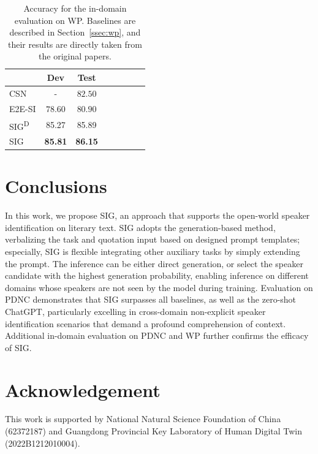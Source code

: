 \documentclass[letterpaper]{article} %
\begin{document}
\begin{table}[htbp!]
    \centering
    \begin{tabular}{l|c c c c c c c}
    \toprule
       & Dev & Test \\ 
       \midrule
        CSN & - & $82.50$ \\
        E2E-SI & $78.60$ & $80.90 $ \\
        SIG\textsuperscript{D} & 85.27 & 85.89\\
        SIG & \textbf{85.81} & \textbf{86.15} \\ 
        \bottomrule
    \end{tabular}
    \caption{Accuracy for the in-domain evaluation on WP. Baselines are described in Section~\ref{ssec:wp}, and their results are directly taken from the original papers.}
    \label{tab:chinese-result}
\end{table}


\section{Conclusions}
In this work, we propose SIG, an approach that supports the open-world speaker identification on literary text. SIG adopts the generation-based method, verbalizing the task and quotation input based on designed prompt templates; especially, SIG is flexible integrating other auxiliary tasks by simply extending the prompt. The inference can be either direct generation, or select the speaker candidate with the highest generation probability, enabling inference on different domains whose speakers are not seen by the model during training.
Evaluation on PDNC demonstrates that SIG surpasses all baselines, as well as the zero-shot ChatGPT, particularly excelling in cross-domain non-explicit speaker identification scenarios that demand a profound comprehension of context. Additional in-domain evaluation on PDNC and WP further confirms the efficacy of SIG. 

\section*{Acknowledgement}

This work is supported by National Natural Science Foundation of China (62372187) and Guangdong Provincial Key Laboratory of Human Digital Twin (2022B1212010004).


\end{document}
